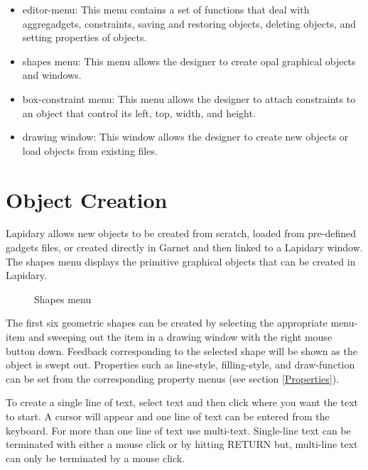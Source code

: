 \begin{itemize}
\item editor-menu: This menu contains a set of functions that deal with aggregadgets,
constraints, saving and restoring objects, deleting objects,
and setting properties of objects.

\item shapes menu: This menu allows the designer to create opal graphical objects
and windows.

\item box-constraint menu: This menu allows the designer to attach constraints to
an object that control its left, top, width, and height.

\item drawing window: This window allows the designer to create new
objects or load objects from existing files.

\end{itemize}

\section{Object Creation}
Lapidary allows new objects to be created from scratch,
loaded from pre-defined gadgets files, or created directly in Garnet
and then linked to a Lapidary window.  The shapes menu displays the
primitive graphical objects that can be created in Lapidary.

\begin{figure}
\begin{center}
\end{center}
\caption{Shapes menu}
\end{figure}

The first six geometric shapes can be created by selecting the
appropriate menu-item
and sweeping out the item in a drawing window with the right mouse button down.
Feedback corresponding to the selected shape will be shown as the
object is swept out.   Properties  such as line-style, filling-style, and
draw-function can be set from the corresponding property menus (see
section \ref{Properties}).

To create a single line of text, select text and then click where
you want the text to start.  A cursor will
appear and one line of text can be entered from the keyboard.  For more
than one line of text use multi-text.  Single-line text can be terminated
with either a mouse click or by hitting RETURN but, multi-line text
can only be terminated by a mouse click.

